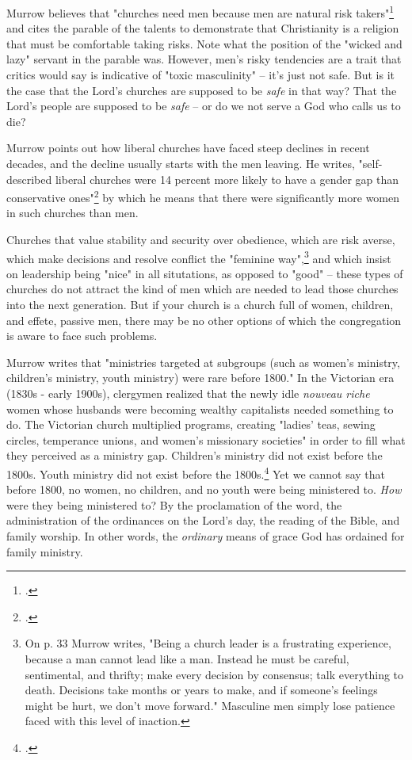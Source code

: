 \documentclass[justified, nobib]{tufte-handout}
\begin{document}
Murrow believes that "churches need men because men are natural risk takers"\footcite[p. 25]{murrowmen} and cites the parable of the talents to demonstrate that Christianity is a religion that must be comfortable taking risks.  Note what the position of the "wicked and lazy" servant in the parable was.  However, men's risky tendencies are a trait that critics would say is indicative of "toxic masculinity" -- it's just not safe.  But is it the case that the Lord's churches are supposed to be \textit{safe} in that way?  That the Lord's people are supposed to be \textit{safe} -- or do we not serve a God who calls us to die?

Murrow points out how liberal churches have faced steep declines in recent decades, and the decline usually starts with the men leaving.  He writes, "self-described liberal churches were 14 percent more likely to have a gender gap than conservative ones"\footcite[p. 25]{murrowmen} by which he means that there were significantly more women in such churches than men.

Churches that value stability and security over obedience, which are risk averse, which make decisions and resolve conflict the "feminine way",\footnote{On p. 33 Murrow writes, "Being a church leader is a frustrating experience, because a man cannot lead like a man.  Instead he must be careful, sentimental, and thrifty; make every decision by consensus; talk everything to death.  Decisions take months or years to make, and if someone's feelings might be hurt, we don't move forward."  Masculine men simply lose patience faced with this level of inaction.} and which insist on leadership being "nice" in all situtations, as opposed to "good" -- these types of churches do not attract the kind of men which are needed to lead those churches into the next generation.  But if your church is a church full of women, children, and effete, passive men, there may be no other options of which the congregation is aware to face such problems.  

Murrow writes that "ministries targeted at subgroups (such as women's ministry, children's ministry, youth ministry) were rare before 1800." In the Victorian era (1830s - early 1900s), clergymen realized that the newly idle \textit{nouveau riche} women whose husbands were becoming wealthy capitalists needed something to do.  The Victorian church multiplied programs, creating "ladies' teas, sewing circles, temperance unions, and women's missionary societies" in order to fill what they perceived as a ministry gap.  Children's ministry did not exist before the 1800s.  Youth ministry did not exist before the 1800s.\footcite[p. 59]{murrowmen}  Yet we cannot say that before 1800, no women, no children, and no youth were being ministered to.  \textit{How} were they being ministered to?  By the proclamation of the word, the administration of the ordinances on the Lord's day, the reading of the Bible, and family worship.  In other words, the \textit{ordinary} means of grace God has ordained for family ministry.
\end{document}
